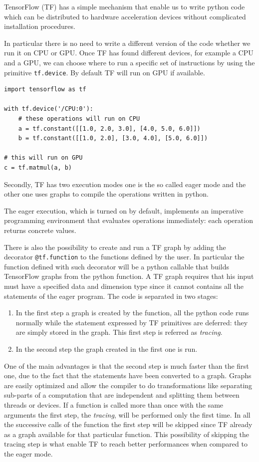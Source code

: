 \documentclass[../main/main.tex]{subfiles}
\begin{document}
TensorFlow (TF) has a simple mechanism that enable us to write python code which can be distributed to hardware 
 acceleration devices without complicated installation procedures.
 
 In particular there is no need to write a different version of the code whether we run it on CPU or GPU. Once TF has found different devices, for example a CPU and a GPU, we can choose where to run a specific set of instructions by using the primitive \texttt{tf.device}.
 By default TF will run on GPU if available.
 
\begin{verbatim}
import tensorflow as tf

with tf.device('/CPU:0'):
	# these operations will run on CPU
	a = tf.constant([[1.0, 2.0, 3.0], [4.0, 5.0, 6.0]])
	b = tf.constant([[1.0, 2.0], [3.0, 4.0], [5.0, 6.0]])
		
# this will run on GPU	
c = tf.matmul(a, b)
\end{verbatim}

Secondly, TF has two execution modes one is the so called eager mode and the other one uses graphs to compile the operations written in python.

The eager execution, which is turned on by default, implements an imperative programming environment that evaluates operations immediately: each operation returns concrete values. 

There is also the possibility to create and run a  TF graph by adding the decorator \texttt{@tf.function} to the functions defined by the user. In particular the function defined with such decorator will be a python callable that builds TensorFlow graphs from the python function.
A TF graph requires that his input must have a specified data and dimension type since it cannot contains all the statements of the eager program. The code is separated in two stages:
\begin{enumerate}
	\item In the first step a graph is created by the function, all the python code runs normally while the statement expressed by TF primitives are deferred: they are simply stored in the graph. This first step is referred as \emph{tracing}.
	\item In the second step the graph created in the first one is run.
\end{enumerate}

One of the main advantages is that the second step is much faster than the first one, due to the fact that the statements have been converted to a graph. 
Graphs are easily optimized and allow the compiler to do transformations like separating sub-parts of a computation that are independent and splitting them between threads or devices.
If a function is called more than once with the same arguments the first step, the \emph{tracing}, will be performed only the first time. In all the successive calls of the function the first step will be skipped since TF already as a graph available for that particular function.
This possibility of skipping the tracing step is what enable TF to reach better performances when compared to the eager mode. 
\end{document}
